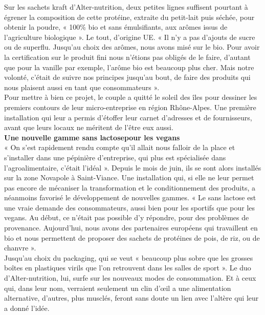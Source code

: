 \documentclass[8pt]{article}
\begin{document}
Sur les sachets kraft d'Alter-nutrition, deux petites lignes suffisent pourtant à égrener la composition de cette protéine, extraite du petit-lait puis séchée, pour obtenir la poudre, « 100\% bio et sans émulsifiants, aux arômes issus de l'agriculture biologique ». Le tout, d'origine UE. « Il n'y a pas d'ajouts de sucre ou de superflu. Jusqu'au choix des arômes, nous avons misé sur le bio. Pour avoir la certification sur le produit fini nous n'étions pas obligés de le faire, d'autant que pour la vanille par exemple, l'arôme bio est beaucoup plus cher. Mais notre volonté, c'était de suivre nos principes jusqu'au bout, de faire des produits qui nous plaisent aussi en tant que consommateurs ».\\

Pour mettre à bien ce projet, le couple a quitté le soleil des îles pour dessiner les premiers contours de leur micro-entreprise en région Rhône-Alpes. Une première installation qui leur a permis d'étoffer leur carnet d'adresses et de fournisseurs, avant que leurs locaux ne méritent de l'être eux aussi.\\

\textbf{Une nouvelle gamme sans lactosepour les vegans}\\

« On s'est rapidement rendu compte qu'il allait nous falloir de la place et s'installer dans une pépinière d'entreprise, qui plus est spécialisée dans l'agroalimentaire, c'était l'idéal ». Depuis le mois de juin, ils se sont alors installés sur la zone Novapole à Saint-Viance. Une installation qui, si elle ne leur permet pas encore de mécaniser la transformation et le conditionnement des produits, a néanmoins favorisé le développement de nouvelles gammes. « Le sans lactose est une vraie demande des consommateurs, aussi bien pour les sportifs que pour les vegans. Au début, ce n'était pas possible d'y répondre, pour des problèmes de provenance. Aujourd'hui, nous avons des partenaires européens qui travaillent en bio et nous permettent de proposer des sachets de protéines de pois, de riz, ou de chanvre ».\\

Jusqu'au choix du packaging, qui se veut « beaucoup plus sobre que les grosses boîtes en plastiques virils que l'on retrouvent dans les salles de sport ». Le duo d'Alter-nutrition, lui, surfe sur les nouveaux modes de consommation. Et à ceux qui, dans leur nom, verraient seulement un clin d'œil a une alimentation alternative, d'autres, plus musclés, feront sans doute un lien avec l'altère qui leur a donné l'idée. 
\end{document}
